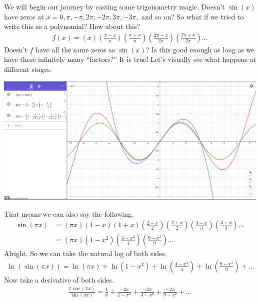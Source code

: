 \documentclass{ximera}
\begin{document}
\begin{exercise}	
	We will begin our journey by casting some trigonometry magic. Doesn't $\sin(x)$ have zeros at $x=0,\pi,-\pi,2\pi,-2\pi,3\pi,-3\pi,$ and so on? So what if we tried to write this as a polynomial? How about this?
	\begin{align*}
		f(x)= \left( x \right) \left( \frac{\pi-x}{\pi} \right) \left( \frac{\pi+x}{\pi} \right) \left(\frac{2\pi- x}{2\pi} \right) \left( \frac{2\pi+x}{2\pi} \right) \ldots
	\end{align*}
	Doesn't $f$ have all the same zeros as $\sin(x)$? Is this good enough as long as we have these infinitely many ``factors?'' It is true! Let's visually see what happens at different stages.
	\begin{image}
		\includegraphics{sin.png}
	\end{image}
	That means we can also say the following.
	\begin{align*}
		\sin(\pi x) &= \left( \pi x \right) \left( 1-x \right) \left(1+x \right) \left(\frac{2-x}{2} \right) \left(\frac{2+x}{2} \right) \left( \frac{3-x}{3} \right) \left( \frac{3+x}{3} \right) \ldots \\
		&= \left( \pi x \right) \left( 1-x^2 \right) \left(\frac{4-x^2}{4} \right) \left(\frac{9-x^2}{9} \right) \ldots
	\end{align*}
	Alright. So we can take the natural log of both sides.
	\begin{align*}
		\ln(\sin(\pi x)) = \ln \left( \pi x \right)+\ln \left( 1-x^2  \right) +\ln \left(\frac{4-x^2}{4} \right) +\ln \left(\frac{9-x^2}{9} \right)+ \ldots
	\end{align*}
	Now take a derivative of both sides.
	\begin{align*}
		\frac{\pi \cos(\pi x)}{\sin(\pi x)} = \frac{1}{x}+\frac{-2x}{1-x^2}+\frac{-2x}{4-x^2}+\frac{-2x}{9-x^2}+\ldots \\	
	\end{align*}

\end{exercise}
\end{document}
